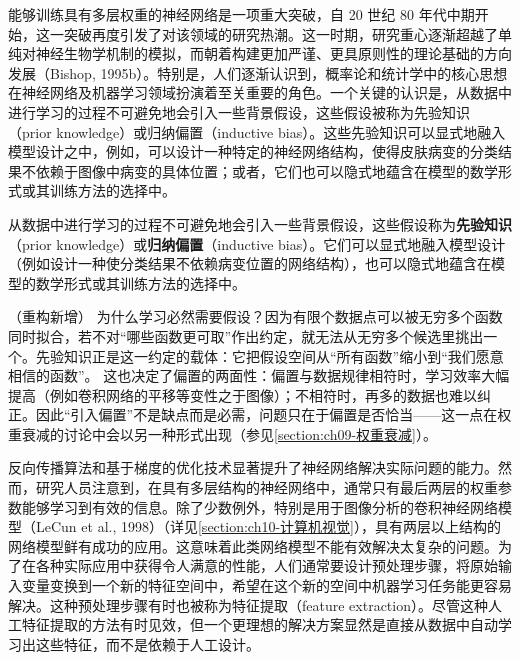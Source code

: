 \documentclass[../../main.tex]{subfiles}
\begin{document}
能够训练具有多层权重的神经网络是一项重大突破，自 20 世纪 80 年代中期开始，这一突破再度引发了对该领域的研究热潮。这一时期，研究重心逐渐超越了单纯对神经生物学机制的模拟，而朝着构建更加严谨、更具原则性的理论基础的方向发展（Bishop, 1995b）。特别是，人们逐渐认识到，概率论和统计学中的核心思想在神经网络及机器学习领域扮演着至关重要的角色。一个关键的认识是，从数据中进行学习的过程不可避免地会引入一些背景假设，这些假设被称为先验知识（prior knowledge）或归纳偏置（inductive bias）。这些先验知识可以显式地融入模型设计之中，例如，可以设计一种特定的神经网络结构，使得皮肤病变的分类结果不依赖于图像中病变的具体位置；或者，它们也可以隐式地蕴含在模型的数学形式或其训练方法的选择中。

\begin{definition}[先验知识与归纳偏置]\label{definition:ch01-先验知识与归纳偏置}
从数据中进行学习的过程不可避免地会引入一些背景假设，这些假设称为\textbf{先验知识}（prior knowledge）或\textbf{归纳偏置}（inductive bias）。它们可以显式地融入模型设计（例如设计一种使分类结果不依赖病变位置的网络结构），也可以隐式地蕴含在模型的数学形式或其训练方法的选择中。
\end{definition}

\begin{remark}（重构新增）
为什么学习必然需要假设？因为有限个数据点可以被无穷多个函数同时拟合，若不对“哪些函数更可取”作出约定，就无法从无穷多个候选里挑出一个。先验知识正是这一约定的载体：它把假设空间从“所有函数”缩小到“我们愿意相信的函数”。
这也决定了偏置的两面性：偏置与数据规律相符时，学习效率大幅提高（例如卷积网络的平移等变性之于图像）；不相符时，再多的数据也难以纠正。因此“引入偏置”不是缺点而是必需，问题只在于偏置是否恰当——这一点在权重衰减的讨论中会以另一种形式出现（参见\cref{section:ch09-权重衰减}）。
\end{remark}

反向传播算法和基于梯度的优化技术显著提升了神经网络解决实际问题的能力。然而，研究人员注意到，在具有多层结构的神经网络中，通常只有最后两层的权重参数能够学习到有效的信息。除了少数例外，特别是用于图像分析的卷积神经网络模型（LeCun et al., 1998）（详见\cref{section:ch10-计算机视觉}），具有两层以上结构的网络模型鲜有成功的应用。这意味着此类网络模型不能有效解决太复杂的问题。为了在各种实际应用中获得令人满意的性能，人们通常要设计预处理步骤，将原始输入变量变换到一个新的特征空间中，希望在这个新的空间中机器学习任务能更容易解决。这种预处理步骤有时也被称为特征提取（feature extraction）。尽管这种人工特征提取的方法有时见效，但一个更理想的解决方案显然是直接从数据中自动学习出这些特征，而不是依赖于人工设计。
\end{document}
